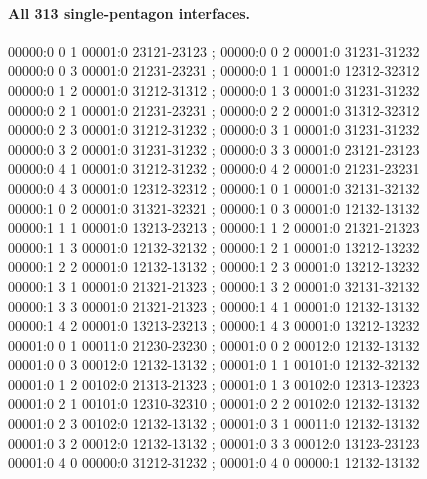 \documentclass[11pt]{article}
\theoremstyle{remark}
\numberwithin{equation}{section}
\numberwithin{table}{section}
\begin{document}
\paragraph{All 313 single-pentagon interfaces.}
\begingroup\footnotesize\ttfamily\begin{flushleft}
00000:0 0 1 00001:0 23121-23123 ; 00000:0 0 2 00001:0 31231-31232\\
00000:0 0 3 00001:0 21231-23231 ; 00000:0 1 1 00001:0 12312-32312\\
00000:0 1 2 00001:0 31212-31312 ; 00000:0 1 3 00001:0 31231-31232\\
00000:0 2 1 00001:0 21231-23231 ; 00000:0 2 2 00001:0 31312-32312\\
00000:0 2 3 00001:0 31212-31232 ; 00000:0 3 1 00001:0 31231-31232\\
00000:0 3 2 00001:0 31231-31232 ; 00000:0 3 3 00001:0 23121-23123\\
00000:0 4 1 00001:0 31212-31232 ; 00000:0 4 2 00001:0 21231-23231\\
00000:0 4 3 00001:0 12312-32312 ; 00000:1 0 1 00001:0 32131-32132\\
00000:1 0 2 00001:0 31321-32321 ; 00000:1 0 3 00001:0 12132-13132\\
00000:1 1 1 00001:0 13213-23213 ; 00000:1 1 2 00001:0 21321-21323\\
00000:1 1 3 00001:0 12132-32132 ; 00000:1 2 1 00001:0 13212-13232\\
00000:1 2 2 00001:0 12132-13132 ; 00000:1 2 3 00001:0 13212-13232\\
00000:1 3 1 00001:0 21321-21323 ; 00000:1 3 2 00001:0 32131-32132\\
00000:1 3 3 00001:0 21321-21323 ; 00000:1 4 1 00001:0 12132-13132\\
00000:1 4 2 00001:0 13213-23213 ; 00000:1 4 3 00001:0 13212-13232\\
00001:0 0 1 00011:0 21230-23230 ; 00001:0 0 2 00012:0 12132-13132\\
00001:0 0 3 00012:0 12132-13132 ; 00001:0 1 1 00101:0 12132-32132\\
00001:0 1 2 00102:0 21313-21323 ; 00001:0 1 3 00102:0 12313-12323\\
00001:0 2 1 00101:0 12310-32310 ; 00001:0 2 2 00102:0 12132-13132\\
00001:0 2 3 00102:0 12132-13132 ; 00001:0 3 1 00011:0 12132-13132\\
00001:0 3 2 00012:0 12132-13132 ; 00001:0 3 3 00012:0 13123-23123\\
00001:0 4 0 00000:0 31212-31232 ; 00001:0 4 0 00000:1 12132-13132\\

\end{flushleft}
\end{document}

